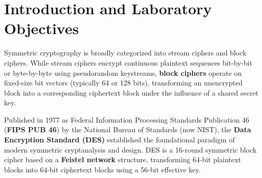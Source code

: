 \documentclass[12pt,a4paper]{article}
\begin{document}
\section{Introduction and Laboratory Objectives}

Symmetric cryptography is broadly categorized into stream ciphers and block ciphers. While stream ciphers encrypt continuous plaintext sequences bit-by-bit or byte-by-byte using pseudorandom keystreams, \textbf{block ciphers} operate on fixed-size bit vectors (typically 64 or 128 bits), transforming an unencrypted block into a corresponding ciphertext block under the influence of a shared secret key.

Published in 1977 as Federal Information Processing Standards Publication 46 (\textbf{FIPS PUB 46}) by the National Bureau of Standards (now NIST), the \textbf{Data Encryption Standard (DES)} established the foundational paradigm of modern symmetric cryptanalysis and design. DES is a 16-round symmetric block cipher based on a \textbf{Feistel network} structure, transforming 64-bit plaintext blocks into 64-bit ciphertext blocks using a 56-bit effective key.
\end{document}

